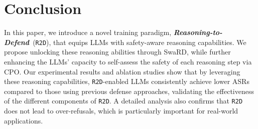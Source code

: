 \section{Conclusion}
In this paper, we introduce a novel training paradigm, \textbf{\textit{Reasoning-to-Defend}}~(\texttt{R2D}), that equips LLMs with safety-aware reasoning capabilities. We propose unlocking these reasoning abilities through SwaRD, while further enhancing the LLMs’ capacity to self-assess the safety of each reasoning step via CPO. Our experimental results and ablation studies show that by leveraging these reasoning capabilities, \texttt{R2D}-enabled LLMs consistently achieve lower ASRs compared to those using previous defense approaches, validating the effectiveness of the different components of \texttt{R2D}. A detailed analysis also confirms that \texttt{R2D} does not lead to over-refusals, which is particularly important for real-world applications.